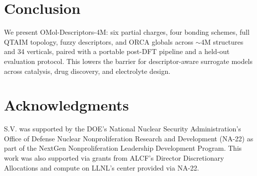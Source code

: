 \section{Conclusion}
\label{sec:conclusion}
We present OMol-Descriptors-4M: six partial charges, four bonding schemes, full
QTAIM topology, fuzzy descriptors, and ORCA globals across $\sim$4M structures
and 34 verticals, paired with a portable post-DFT pipeline and a held-out
evaluation protocol. This lowers the barrier for descriptor-aware surrogate
models across catalysis, drug discovery, and electrolyte design.

\ifanon\else
\section{Acknowledgments}
S.V. was supported by the DOE’s National Nuclear Security Administration’s Office of Defense Nuclear
Nonproliferation Research and Development (NA-22) as part of the NextGen Nonproliferation Leadership
Development Program. This work was also supported via grants from ALCF's Director Discretionary Allocations 
and compute on LLNL's center provided via NA-22.  \fi

